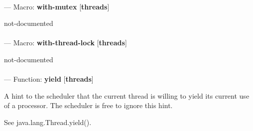 \paragraph{}
\label{THREADS:WITH-MUTEX}
--- Macro: \textbf{with-mutex} [\textbf{threads}] \textit{}

\begin{adjustwidth}{5em}{5em}
not-documented
\end{adjustwidth}

\paragraph{}
\label{THREADS:WITH-THREAD-LOCK}
--- Macro: \textbf{with-thread-lock} [\textbf{threads}] \textit{}

\begin{adjustwidth}{5em}{5em}
not-documented
\end{adjustwidth}

\paragraph{}
\label{THREADS:YIELD}
--- Function: \textbf{yield} [\textbf{threads}] \textit{}

\begin{adjustwidth}{5em}{5em}
A hint to the scheduler that the current thread is willing to yield its current use of a processor. The scheduler is free to ignore this hint. 

See java.lang.Thread.yield().
\end{adjustwidth}

